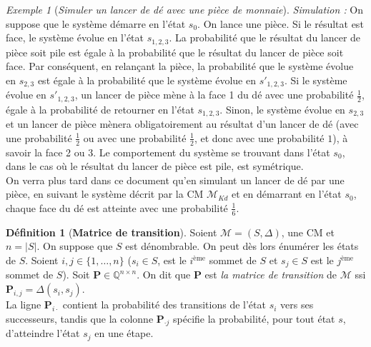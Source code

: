 \documentclass[12pt,a4paper]{report}
\theoremstyle{definition}%
\newtheorem{definition}{Définition}[chapter]
\theoremstyle{remark}
\newtheorem{example}{Exemple}[chapter]
\newcommand{\ssi}{ssi }
\begin{document}
\begin{example} [\textit{Simuler un lancer de dé avec une pièce de monnaie}]
	\textit{Simulation : }On suppose que le système démarre en l'état $s_0$. On lance une pièce. Si le résultat est face, le système évolue en l'état $s_{1, 2, 3}$. La probabilité que le résultat du lancer de pièce soit pile est égale à la probabilité que le résultat du lancer de pièce soit face. Par conséquent, en relançant la pièce, la probabilité que le système évolue en $s_{2, 3}$ est égale à la probabilité que le système évolue en $s'_{1, 2, 3}$. Si le système évolue en $s'_{1, 2, 3}$, un lancer de pièce mène à la face 1 du dé avec une probabilité $\frac{1}{2}$, égale à la probabilité de retourner en l'état $s_{1, 2, 3}$. Sinon, le système évolue en $s_{2, 3}$ et un lancer de pièce mènera obligatoirement au résultat d'un lancer de dé (avec une probabilité $\frac{1}{2} \text{ ou avec une probabilité }  \frac{1}{2}$, et donc avec une probabilité $1$), à savoir la face 2 ou 3. Le comportement du système se trouvant dans l'état $s_0$, dans le cas où le résultat du lancer de pièce est pile, est symétrique.\\

	On verra plus tard dans ce document qu'en simulant un lancer de dé par une pièce, en suivant le système décrit par la CM $\mathcal{M}_{Kd}$ et en démarrant en l'état $s_0$, chaque face du dé est atteinte avec une probabilité $\frac{1}{6}$.\\

\end{example}

\begin{definition}[\textbf{Matrice de transition}]
	Soient $\mathcal{M} = (S, \Delta)$, une CM et $n = |S|$. On suppose que $S$ est dénombrable. On peut dès lors énumérer les états de $S$. Soient $i,j \in \{1, \dots, n\}$ ($s_i \in S$, est le $i^{\text{ème}}$ sommet de $S$ et $s_j \in S$ est le $j^{\text{ème}}$ sommet de $S$). Soit \textbf{P}$\in \mathbb{Q}^{n \times n}$. On dit que
	\textbf{P} est \textit{la matrice de transition} de $\mathcal{M}$ \ssi $\textbf{P}_{i,j} = \Delta(s_i, s_j)$.\\
	La ligne $\textbf{P}_{i \cdot}$ contient la probabilité des transitions de l'état $s_i$ vers ses successeurs, tandis que la colonne $\textbf{P}_{\cdot j}$ spécifie la probabilité, pour tout état $s$, d'atteindre l'état $s_j$ en une étape.
\end{definition}
\end{document}
